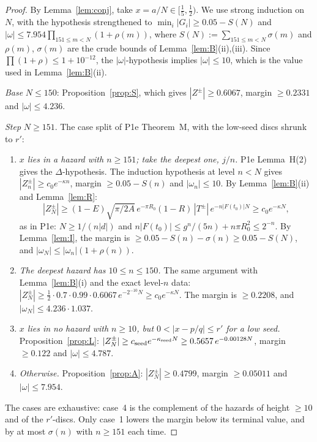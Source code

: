 \documentclass[11pt]{article}
\theoremstyle{definition}\newtheorem{definition}[theorem]{Definition}
\theoremstyle{remark}\newtheorem{remark}[theorem]{Remark}
\begin{document}
\begin{proof}
By Lemma~\ref{lem:conj}, take $x=a/N\in[\frac15,\frac12)$. We use strong induction on $N$, with the hypothesis strengthened to $\min_i|G_i|\ge0.05-S(N)$ and $|\omega|\le7.954\prod_{151\le m<N}(1+\rho(m))$, where $S(N):=\sum_{151\le m<N}\sigma(m)$ and $\rho(m)$, $\sigma(m)$ are the crude bounds of Lemma~\ref{lem:B}(ii),(iii). Since $\prod(1+\rho)\le1+10^{-12}$, the $|\omega|$-hypothesis implies $|\omega|\le10$, which is the value used in Lemma~\ref{lem:B}(ii).

\emph{Base} $N\le150$: Proposition~\ref{prop:S}, which gives $|Z^\pm|\ge0.6067$, margin $\ge0.2331$ and $|\omega|\le4.236$.

\emph{Step} $N\ge151$. The case split of P1e Theorem~M, with the low-seed discs shrunk to $r'$:
\begin{enumerate}
\item \emph{$x$ lies in a hazard with $n\ge151$; take the deepest one, $j/n$.} P1e Lemma~H(2) gives the $\Delta$-hypothesis. The induction hypothesis at level $n<N$ gives $|Z^\pm_n|\ge c_0e^{-\kappa n}$, margin $\ge0.05-S(n)$ and $|\omega_n|\le10$.
 By Lemma~\ref{lem:B}(ii) and Lemma~\ref{lem:R}:
 \[|Z^\pm_N|\ge(1-E)\sqrt{\pi/2A}\,e^{-\pi R_0}(1-R)\,|T^\pm|\,e^{-n|F(t_0)|N}\ge c_0e^{-\kappa N},\]
 as in P1e: $N\ge1/(n|d|)$ and $n|F(t_0)|\le g^n/(5n)+n\pi R_0^2\le2^{-n}$.
 By Lemma~\ref{lem:I}, the margin is $\ge0.05-S(n)-\sigma(n)\ge0.05-S(N)$, and $|\omega_N|\le|\omega_n|(1+\rho(n))$.
\item \emph{The deepest hazard has $10\le n\le150$.} The same argument with Lemma~\ref{lem:B}(i) and the exact level-$n$ data: $|Z^\pm_N|\ge\frac12\cdot0.7\cdot0.99\cdot0.6067\,e^{-2^{-10}N}\ge c_0e^{-\kappa N}$. The margin is $\ge0.2208$, and $|\omega_N|\le4.236\cdot1.037$.
\item \emph{$x$ lies in no hazard with $n\ge10$, but $0<|x-p/q|\le r'$ for a low seed.} Proposition~\ref{prop:L}: $|Z^\pm_N|\ge c_{\rm seed}e^{-\kappa_{\rm seed}N}\ge0.5657\,e^{-0.00128N}$, margin $\ge0.122$ and $|\omega|\le4.787$.
\item \emph{Otherwise.} Proposition~\ref{prop:A}: $|Z^\pm_N|\ge0.4799$, margin $\ge0.05011$ and $|\omega|\le7.954$.
\end{enumerate}
The cases are exhaustive: case~4 is the complement of the hazards of height $\ge10$ and of the $r'$-discs. Only case~1 lowers the margin below its terminal value, and by at most $\sigma(n)$ with $n\ge151$ each time.
\end{proof}
\end{document}
